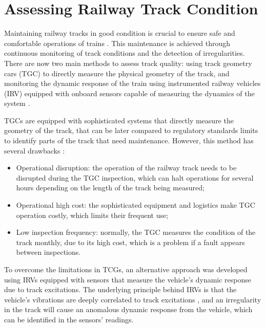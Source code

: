 \section{Assessing Railway Track Condition} \label{sec-assessing-railway-track}

Maintaining railway tracks in good condition is crucial to ensure safe and comfortable operations of trains \cite{Tsunashima-2019,GHIASI2025109516}. This maintenance is achieved through continuous monitoring of track conditions and the detection of irregularities. There are now two main methods to assess track quality: using track geometry cars (TGC) to directly measure the physical geometry of the track, and monitoring the dynamic response of the train using instrumented railway vehicles (IRV) equipped with onboard sensors capable of measuring the dynamics of the system \cite{PIRES2024107191}.

TGCs are equipped with sophisticated systems that directly measure the geometry of the track, that can be later compared to regulatory standards limits to identify parts of the track that need maintenance. However, this method has several drawbacks \cite{PIRES2024107191,GHIASI2025109516,Hironori_ONO202322-00239}:
\begin{itemize}
    \item Operational disruption: the operation of the railway track needs to be disrupted during the TGC inspection, which can halt operations for several hours depending on the length of the track being measured;
    \item Operational high cost: the sophisticated equipment and logistics make TGC operation costly, which limits their frequent use;
    \item Low inspection frequency: normally, the TGC measures the condition of the track monthly, due to its high cost, which is a problem if a fault appears between inspections.
\end{itemize}

To overcome the limitations in TCGs, an alternative approach was developed using IRVs equipped with sensors that measure the vehicle's dynamic response due to track excitations. The underlying principle behind IRVs is that the vehicle's vibrations are deeply correlated to track excitations \cite{PIRES2024107191,Tsunashima-2019}, and an irregularity in the track will cause an anomalous dynamic response from the vehicle, which can be identified in the sensors' readings. 

